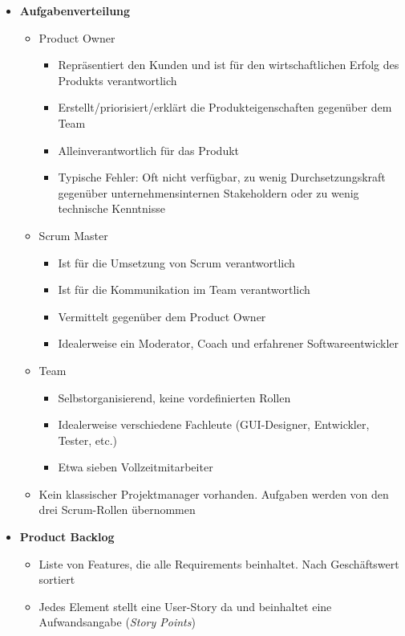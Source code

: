 \begin{itemize}
\begin{itemize}
\begin{minipage}{\linewidth}
		\end{minipage}
	\end{itemize}
	\item \textbf{Aufgabenverteilung}
	\begin{itemize}
		\item Product Owner
		\begin{itemize}
			\item Repräsentiert den Kunden und ist für den wirtschaftlichen Erfolg des Produkts verantwortlich
			\item Erstellt/priorisiert/erklärt die Produkteigenschaften gegenüber dem Team
			\item Alleinverantwortlich für das Produkt
			\item Typische Fehler: Oft nicht verfügbar, zu wenig Durchsetzungskraft gegenüber unternehmensinternen Stakeholdern oder zu wenig technische Kenntnisse
		\end{itemize}
		\item Scrum Master
		\begin{itemize}
			\item Ist für die Umsetzung von Scrum verantwortlich
			\item Ist für die Kommunikation im Team verantwortlich
			\item Vermittelt gegenüber dem Product Owner
			\item Idealerweise ein Moderator, Coach und erfahrener Softwareentwickler
		\end{itemize}
		\item Team
		\begin{itemize}
			\item Selbstorganisierend, keine vordefinierten Rollen
			\item Idealerweise verschiedene Fachleute (GUI-Designer, Entwickler, Tester, etc.)
			\item Etwa sieben Vollzeitmitarbeiter
		\end{itemize}
		\item Kein klassischer Projektmanager vorhanden. Aufgaben werden von den drei Scrum-Rollen übernommen
	\end{itemize}
	\item \textbf{Product Backlog}
	\begin{itemize}
		\item Liste von Features, die alle Requirements beinhaltet. Nach Geschäftswert sortiert
		\item Jedes Element stellt eine User-Story da und beinhaltet eine Aufwandsangabe (\textit{Story Points})

\end{itemize}
\end{itemize}
